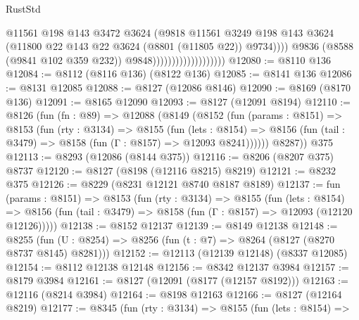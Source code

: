 \begin{lexlean}{RustStd}
\begin{coremodule}
                                              @11561
                                              @198
                                              @143
                                              @3472
                                              @3624
                                              (@9818
                                                @11561
                                                @3249
                                                @198
                                                @143
                                                @3624
                                                (@11800
                                                  @22
                                                  @143
                                                  @22
                                                  @3624
                                                  (@8801 (@11805 @22))
                                                  @9734))))
                                          @9836
                                          (@8588 (@9841 @102 @359 @232))
                                          @9848)))))))))))))))))))
@12080 := @8110 @136
@12084 := @8112 (@8116 @136) (@8122 @136)
@12085 := @8141 @136
@12086 := @8131 @12085
@12088 := @8127 (@12086 @8146)
@12090 := @8169 (@8170 @136)
@12091 := @8165 @12090
@12093 := @8127 (@12091 @8194)
@12110 := @8126
    (fun (fn : @89) =>
    @12088
      (@8149
        (@8152
          (fun (params : @8151) =>
          @8153
            (fun (rty : @3134) =>
            @8155
              (fun (lets : @8154) =>
              @8156 (fun (tail : @3479) => @8158 (fun (Γ : @8157) => @12093 @8241))))))
        @8287))
    @375
@12113 := @8293 (@12086 (@8144 @375))
@12116 := @8206 (@8207 @375) @8737
@12120 := @8127 (@8198 (@12116 @8215) @8219)
@12121 := @8232 @375
@12126 := @8229 (@8231 @12121 @8740 @8187 @8189)
@12137 := fun (params : @8151) =>
  @8153
    (fun (rty : @3134) =>
    @8155
      (fun (lets : @8154) =>
      @8156 (fun (tail : @3479) => @8158 (fun (Γ : @8157) => @12093 (@12120 @12126)))))
@12138 := @8152 @12137
@12139 := @8149 @12138
@12148 := @8255 (fun (U : @8254) => @8256 (fun (t : @7) => @8264 (@8127 (@8270 @8737 @8145) @8281)))
@12152 := @12113 (@12139 @12148) (@8337 @12085)
@12154 := @8112 @12138 @12148
@12156 := @8342 @12137 @3984
@12157 := @8179 @3984
@12161 := @8127 (@12091 (@8177 (@12157 @8192)))
@12163 := @12116 (@8214 @3984)
@12164 := @8198 @12163
@12166 := @8127 (@12164 @8219)
@12177 := @8345
    (fun (rty : @3134) =>
    @8155
      (fun (lets : @8154) =>

\end{coremodule}
\end{lexlean}
